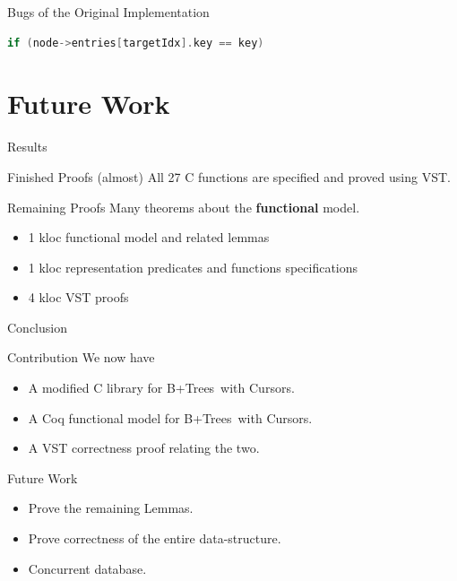 \documentclass[page number,usenames,dvipsnames]{beamer}
\def\btrees{B+Trees}
\begin{document}
\begin{frame}[fragile]{Bugs of the Original Implementation}
  \begin{lstlisting}[language=C]
if (node->entries[targetIdx].key == key)
  \end{lstlisting}
  \vfill
  \bugcursor
\end{frame}

\section{Future Work}
\begin{frame}{Results}

  \begin{exampleblock}{Finished Proofs}
    {\color{Gray}(almost)} All 27 C functions are specified and proved using VST.
  \end{exampleblock}
  \vfill
  \begin{alertblock}{Remaining Proofs}
    Many theorems about the \textbf{functional} model.
  \end{alertblock}
  \vfill
  \begin{itemize}
  \item 1 kloc functional model and related lemmas
  \item 1 kloc representation predicates and functions specifications
  \item 4 kloc VST proofs
  \end{itemize}
  
\end{frame}

\begin{frame}{Conclusion}
  \begin{block}{Contribution}
    We now have
    \begin{itemize}
    \item A modified C library for \btrees\ with Cursors.
    \item A Coq functional model for \btrees\ with Cursors.
    \item A VST correctness proof relating the two.
    \end{itemize}
  \end{block}
  \vfill
  \begin{block}{Future Work}
    \begin{itemize}
    \item Prove the remaining Lemmas.
    \item Prove correctness of the entire data-structure.
    \item Concurrent database.
    \end{itemize}
  \end{block}
  
\end{frame}
\end{document}
